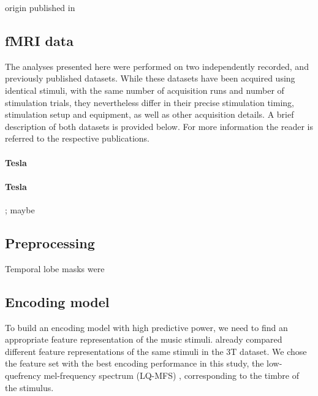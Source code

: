 origin \citet{CTK+2012}
published in \citet{HDH+2015}

\subsection*{fMRI data}

The analyses presented here were performed on two independently recorded,
and previously published datasets. While these datasets have been acquired
using identical stimuli, with the same number of acquisition runs and
number of stimulation trials, they nevertheless differ in their precise
stimulation timing, stimulation setup and equipment, as well as other
acquisition details. A brief description of both datasets is provided below.
For more information the reader is referred to the respective publications.

\paragraph{\unit[3]{Tesla}}
%

\paragraph{\unit[7]{Tesla}}
%
\citet{HDH+2015}; maybe \citet{HBI+14}


\subsection*{Preprocessing}

Temporal lobe masks were

\subsection*{Encoding model}


To build an encoding model with high predictive power, we need to find an
appropriate feature representation of the music stimuli.  \citet{CTK+2012}
already compared different feature representations of the same stimuli in the
3T dataset. We chose the feature set with the best encoding performance in this
study, the low-quefrency mel-frequency spectrum (LQ-MFS) \citep{HDH+2015},
corresponding to the timbre of the stimulus. 

